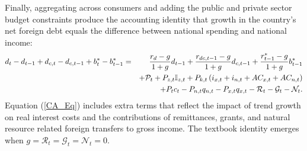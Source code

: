 \documentclass[11pt]{article}
\begin{document}
Finally, aggregating across consumers and adding the public and private
sector budget constraints produce the accounting identity that growth in the
country's net foreign debt equals the difference between national spending
and national income: 
\begin{eqnarray}
d_{t}-d_{t-1}+d_{c,t}-d_{c,t-1}+b_{t}^{\ast }-b_{t-1}^{\ast } &=&\frac{%
r_{d}-g}{1+g}d_{t-1}+\frac{r_{dc,t-1}-g}{1+g}d_{c,t-1}+\frac{r_{t-1}^{\ast
}-g}{1+g}b_{t-1}^{\ast }  \label{CA_Eq} \\
&&+\mathcal{P}_{t}+P_{z,t}\mathbb{I}_{z,t}+P_{k,t}\left(
i_{x,t}+i_{n,t}+AC_{x,t}+AC_{n,t}\right)  \notag \\
&&+P_{t}c_{t}-P_{n,t}q_{n,t}-P_{x,t}q_{x,t}-\mathcal{R}_{t}-\mathcal{G}_{t}-%
\mathcal{N}_{t}.  \notag
\end{eqnarray}%
Equation (\ref{CA_Eq}) includes extra terms that reflect the impact of trend
growth on real interest costs and the contributions of remittances, grants,
and natural resource related foreign transfers to gross income. The textbook
identity emerges when $g=\mathcal{R}_{t}=\mathcal{G}_{t}=\mathcal{N}_{t}=0$.
\end{document}

